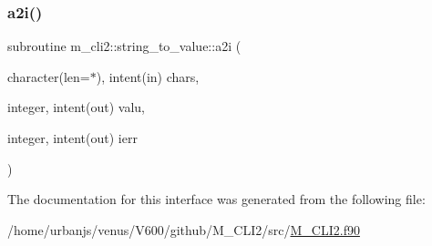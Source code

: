 \mbox{\label{interfacem__cli2_1_1string__to__value_af221de32e1c7dd6915ea45dc3a0147ed}} 
\subsubsection{\texorpdfstring{a2i()}{a2i()}}
{\footnotesize\ttfamily subroutine m\+\_\+cli2\+::string\+\_\+to\+\_\+value\+::a2i (\begin{DoxyParamCaption}\item[{character(len=$\ast$), intent(in)}]{chars,  }\item[{integer, intent(out)}]{valu,  }\item[{integer, intent(out)}]{ierr }\end{DoxyParamCaption})\hspace{0.3cm}{\ttfamily [private]}}



The documentation for this interface was generated from the following file\+:\begin{DoxyCompactItemize}
\item 
/home/urbanjs/venus/\+V600/github/\+M\+\_\+\+C\+L\+I2/src/\mbox{\hyperlink{M__CLI2_8f90}{M\+\_\+\+C\+L\+I2.\+f90}}\end{DoxyCompactItemize}
